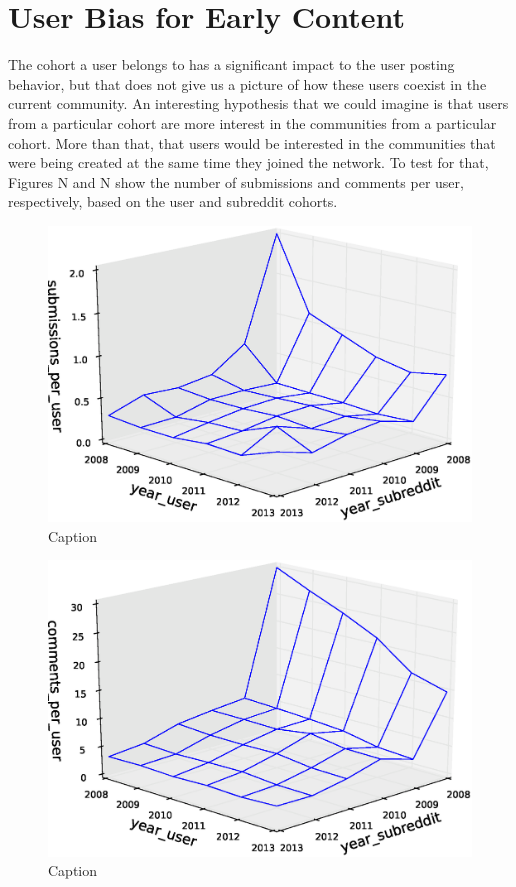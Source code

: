 \section{User Bias for Early Content}

The cohort a user belongs to has a significant impact to the user posting behavior, but that does not give us a picture of how these users coexist in the current community. An interesting hypothesis that we could imagine is that users from a particular cohort are more interest in the communities from a particular cohort. More than that, that users would be interested in the communities that were being created at the same time they joined the network. To test for that, Figures N and N show the number of submissions and comments per user, respectively, based on the user and subreddit cohorts.

\begin{figure}[!tb]
\centering
\includegraphics[scale=0.4]{./images/user_subreddit_submissions_cohorts.eps}
\caption{Caption}
\label{fig:user_subreddit_submissions_cohorts}
\end{figure}

\begin{figure}[!tb]
\centering
\includegraphics[scale=0.4]{./images/user_subreddit_comments_cohorts.eps}
\caption{Caption}
\label{fig:user_subreddit_comments_cohorts}
\end{figure}

